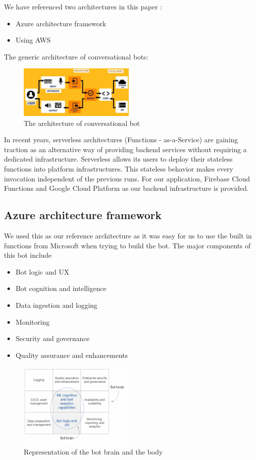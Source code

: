 \documentclass[9pt,software]{livecoms}
\begin{document}
We have referenced two architectures in this paper : 
\begin{itemize}
  \item Azure architecture framework
  \item Using AWS
\end{itemize}

The generic architecture of conversational bots:
\begin{figure}
  \caption{ The architecture of conversational bot}
  \centering
  \includegraphics[width=0.5\textwidth]{simpleRef.png}
\end{figure}

In recent years, serverless architectures (Functions - as-a-Service) are gaining traction as an alternative way  of providing backend services without requiring a  dedicated infrastructure. Serverless allows its users to  deploy their stateless functions into platform  infrastructures. This stateless behavior makes every  invocation independent of the previous runs. For our  application, Firebase Cloud Functions and Google  Cloud Platform as our backend infrastructure is  provided.

\subsection{Azure architecture framework}

We used this as our reference architecture as it was easy for us to use the built in functions from Microsoft when trying to build the bot. The major components of this bot include

\begin{itemize}
  \item Bot logic and UX 
  \item Bot cognition and intelligence 
  \item Data ingestion and logging 
  \item Monitoring 
  \item Security and governance 
  \item Quality assurance and enhancements 
\end{itemize}

\begin{figure}
  \caption{Representation of the bot brain and the body}
  \centering
  \includegraphics[width=0.5\textwidth]{table.png}
\end{figure}
\end{document}
